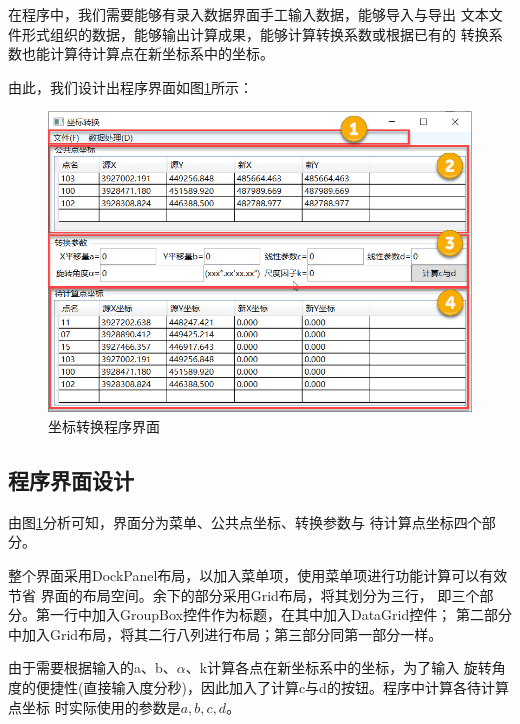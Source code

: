 在程序中，我们需要能够有录入数据界面手工输入数据，能够导入与导出
文本文件形式组织的数据，能够输出计算成果，能够计算转换系数或根据已有的
转换系数也能计算待计算点在新坐标系中的坐标。

由此，我们设计出程序界面如图\ref{fig:XYtoXYUI02}所示：

\begin{figure}[htbp]
    \centering
    \includegraphics[scale=1]{xytoxy/XYtoXYUI02.png}
    \caption{坐标转换程序界面}
    \label{fig:XYtoXYUI02}
\end{figure}

\subsection{程序界面设计}

由图\ref{fig:XYtoXYUI02}分析可知，界面分为菜单、公共点坐标、转换参数与
待计算点坐标四个部分。

整个界面采用DockPanel布局，以加入菜单项，使用菜单项进行功能计算可以有效节省
界面的布局空间。余下的部分采用Grid布局，将其划分为三行，
即三个部分。第一行中加入GroupBox控件作为标题，在其中加入DataGrid控件；
第二部分中加入Grid布局，将其二行八列进行布局；第三部分同第一部分一样。

由于需要根据输入的a、b、$\alpha$、k计算各点在新坐标系中的坐标，为了输入
旋转角度的便捷性(直接输入度分秒)，因此加入了计算c与d的按钮。程序中计算各待计算点坐标
时实际使用的参数是$a,b,c,d$。

